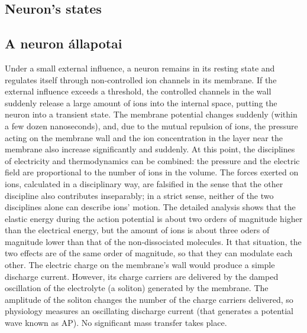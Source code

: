 \ifx\magyar\undefined
\subsection[Neuron's states]{Neuron's states \label{sec:Model-NeuronStates}}
\else
\subsection[A neuron állapotai]{A neuron állapotai\label{sec:Model-NeuronStates}}
\fi

\ifx\magyar\undefined
Under a small external influence, a neuron remains in its resting state and regulates itself through non-controlled ion channels in its membrane.
If the external influence exceeds a threshold, the controlled channels in the wall suddenly release a large amount of ions into the internal space, putting the neuron into a transient state.
The membrane potential changes suddenly (within a few dozen nanoseconds), and, due to the mutual repulsion of ions, the pressure acting on the membrane wall and the ion concentration in the layer near the membrane also increase significantly and suddenly. At this point, the disciplines of electricity and thermodynamics can be combined: the pressure and the electric field are proportional to the number of ions in the volume.
The forces exerted on ions, calculated in a disciplinary way, are falsified 
in the sense that the other discipline also contributes inseparably; in a strict sense, neither of the two disciplines alone can describe ions' motion.
The detailed analysis shows that the elastic energy during the action potential
is about two orders of magnitude higher than the electrical energy, but the 
amount of ions is about three oders of magnitude lower than that of the non-dissociated molecules.
It that situation, the two effects are of the same order of magnitude,
so that they can modulate each other. The electric charge on the membrane's wall 
would produce a simple discharge current. However, its charge carriers are
delivered by the damped oscillation of the electrolyte (a soliton) generated by the membrane.
The amplitude of the soliton changes the number of the charge carriers delivered,
so physiology measures an oscillating discharge current (that generates
a potential wave known as \gls{AP}). No significant mass transfer
takes place.

\else

